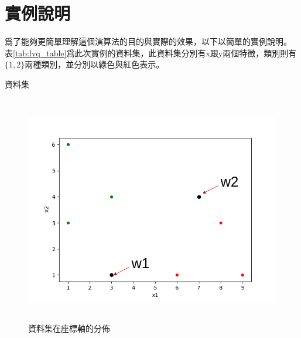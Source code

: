 \section{實例說明}

爲了能夠更簡單理解這個演算法的目的與實際的效果，以下以簡單的實例說明。
表\ref{tab:lvq_table}爲此次實例的資料集，此資料集分別有x跟y兩個特徵，類別則有 \(\{ 1,2\}\)兩種類別，並分別以綠色與紅色表示。


\begin{table}[h!]
	\centering
	\caption{資料集}
	\label{tab:lvq_table}
	
\end{table}


\begin{figure}[h!]
	\centering
	\includegraphics[height=10cm]{./pic/2nSRVeud.png}
	\caption{資料集在座標軸的分佈}
	\label{fig:dataset_in_axis}
\end{figure}

